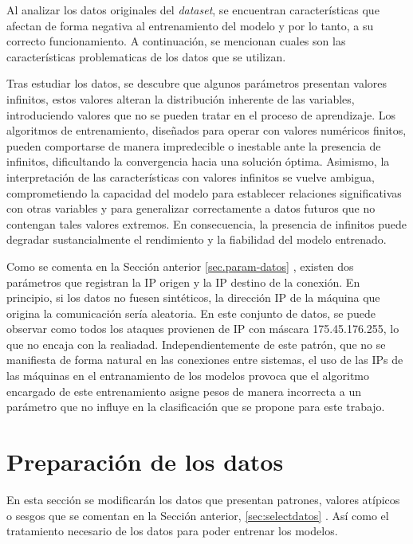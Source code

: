 Al analizar los datos originales del \textit{dataset}, se encuentran características que afectan de forma negativa al entrenamiento del modelo y por lo tanto, a su correcto funcionamiento. A continuación, se mencionan cuales son las características problematicas de los datos que se utilizan.


Tras estudiar los datos, se descubre que algunos parámetros presentan valores infinitos, estos valores alteran la distribución inherente de las variables, introduciendo valores que no se pueden tratar en el proceso de aprendizaje. Los algoritmos de entrenamiento, diseñados para operar con valores numéricos finitos, pueden comportarse de manera impredecible o inestable ante la presencia de infinitos, dificultando la convergencia hacia una solución óptima. Asimismo, la interpretación de las características con valores infinitos se vuelve ambigua, comprometiendo la capacidad del modelo para establecer relaciones significativas con otras variables y para generalizar correctamente a datos futuros que no contengan tales valores extremos. En consecuencia, la presencia de infinitos puede degradar sustancialmente el rendimiento y la fiabilidad del modelo entrenado.

Como se comenta en la Sección anterior \ref{sec.param-datos} , existen dos parámetros que registran la IP origen y la IP destino de la conexión. En principio, si los datos no fuesen sintéticos, la dirección IP de la máquina que origina la comunicación sería aleatoria. En este conjunto de datos, se puede observar como todos los ataques provienen de IP con máscara 175.45.176.255, lo que no encaja con la realiadad. Independientemente de este patrón, que no se manifiesta de forma natural en las conexiones entre sistemas, el uso de las IPs de las máquinas en el entranamiento de los modelos provoca que el algoritmo encargado de este entrenamiento asigne pesos de manera incorrecta a un parámetro que no influye en la clasificación que se propone para este trabajo.



\section{Preparación de los datos}\label{sec.prep-datos}
En esta sección se modificarán los datos que presentan patrones, valores atípicos o sesgos que se comentan en la Sección anterior, \ref{sec:selectdatos} . Así como el tratamiento necesario de los datos para poder entrenar los modelos.

